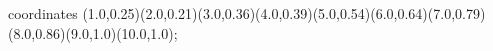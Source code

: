 					coordinates { (1.0,0.25)(2.0,0.21)(3.0,0.36)(4.0,0.39)(5.0,0.54)(6.0,0.64)(7.0,0.79)(8.0,0.86)(9.0,1.0)(10.0,1.0)};